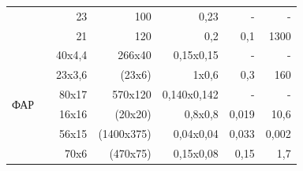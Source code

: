 \begin{table}[h]
{\begin{tabular}[width=\textwidth]{|l|r|r|r|r|r|r|}
                                                                      & \cite{kondo2017fan}          & 23     & 100        & 0,23            & -             & -                \\
                                                                      & \cite{takeuchi2018thermally} & 21     & 120        & 0,2             & 0,1           & 1300             \\
                                                                      & \cite{ito2020wide}           & 40x4,4 & 266x40     & 0,15x0,15       & -             & -                \\
            \hline
            \multirow{4}{*}{\parbox{53pt}{ФАР}}                       & \cite{hulme2015fully}        & 23x3,6 & (23x6)     & 1x0,6           & 0,3           & 160              \\
                                                                      & \cite{hutchison2016high}     & 80x17  & 570x120    & 0,140x0,142     & -             & -                \\
                                                                      & \cite{fatemi2019nonuniform}  & 16x16  & (20x20)    & 0,8x0,8         & 0,019         & 10,6             \\
                                                                      & \cite{poulton2019long}       & 56x15  & (1400x375) & 0,04x0,04       & 0,033         & 0,002            \\
                                                                      & \cite{dostart2020serpentine} & 70x6   & (470x75)   & 0,15x0,08       & 0,15          & 1,7              \\
            \hline
        \end{tabular}}
    \label{tab:comparison}
\end{table}



